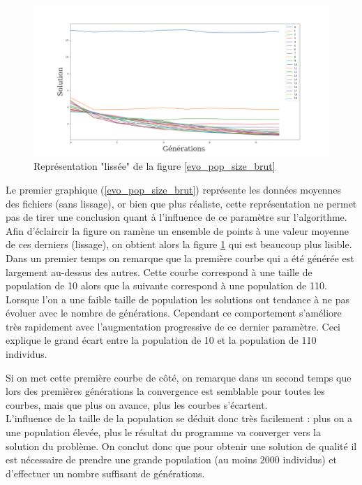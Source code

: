 \documentclass[12pt]{report}
\begin{document}
        \begin{figure}[!]
          \centering
          \includegraphics[width=18cm]{img/evo_pop_size_moy.png}
          \caption{Représentation "lissée" de la figure \ref{evo_pop_size_brut}}
          \label{evo_pop_size_moy}
        \end{figure}
        Le premier graphique (\ref{evo_pop_size_brut}) représente les données moyennes des fichiers (sans lissage), or bien que plus réaliste, cette représentation ne permet pas de tirer une conclusion quant à l'influence de ce paramètre sur l'algorithme. Afin d'éclaircir la figure on ramène un ensemble de points à une valeur moyenne de ces derniers (lissage), on obtient alors la figure \ref{evo_pop_size_moy} qui est beaucoup plus lisible. \\

        Dans un premier temps on remarque que la première courbe qui a été générée est largement au-dessus des autres. Cette courbe correspond à une taille de population de 10 alors que la suivante correspond à une population de 110. Lorsque l'on a une faible taille de population les solutions ont tendance à ne pas évoluer avec le nombre de générations. Cependant ce comportement s'améliore très rapidement avec l'augmentation progressive de ce dernier paramètre. Ceci explique le grand écart entre la population de 10 et la population de 110 individus.

        Si on met cette première courbe de côté, on remarque dans un second temps que lors des premières générations la convergence est semblable pour toutes les courbes, mais que plus on avance, plus les courbes s'écartent.
        \\ L'influence de la taille de la population se déduit donc très facilement : plus on a une population élevée, plus le résultat du programme va converger vers la solution du problème. On conclut donc que pour obtenir une solution de qualité il est nécessaire de prendre une grande population (au moins 2000 individus) et d'effectuer un nombre suffisant de générations.
\end{document}
